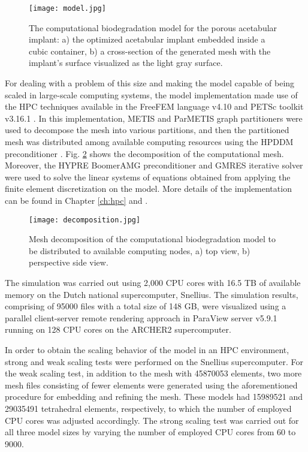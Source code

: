 \begin{figure}[h]
\centering
\medskip
\texttt{[image: model.jpg]}
\caption[Computational biodegradation model for the porous acetabular implant]{The computational biodegradation model for the porous acetabular implant: a) the optimized acetabular implant embedded inside a cubic container, b) a cross-section of the generated mesh with the implant's surface visualized as the light gray surface.} \label{fig:cup_model}
\end{figure}

For dealing with a problem of this size and making the model capable of being scaled in large-scale computing systems, the model implementation made use of the {HPC} techniques available in the FreeFEM language v4.10 and {PETSc} toolkit v3.16.1 \cite{petsc}. In this implementation, METIS and ParMETIS graph partitioners \cite{METIS1998} were used to decompose the mesh into various partitions, and then the partitioned mesh was distributed among available computing resources using the {HPDDM} preconditioner \cite{Jolivet2013}. Fig. \ref{fig:cup_decomposition} shows the decomposition of the computational mesh. Moreover, the HYPRE BoomerAMG \cite{Falgout2002} preconditioner and {GMRES} iterative solver \cite{Saad1986} were used to solve the linear systems of equations obtained from applying the finite element discretization on the model. More details of the implementation can be found in Chapter \ref{ch:hpc} and \cite{Barzegari2022}.

\begin{figure}[h]
\centering
\medskip
\texttt{[image: decomposition.jpg]}
\caption[Mesh decomposition of the acetabular implant model]{Mesh decomposition of the computational biodegradation model to be distributed to available computing nodes, a) top view, b) perspective side view. } \label{fig:cup_decomposition}
\end{figure}

The simulation was carried out using 2,000 {CPU} cores with 16.5 TB of available memory on the Dutch national supercomputer, Snellius. The simulation results, comprising of \num{95000} files with a total size of 148 GB, were visualized using a parallel client-server remote rendering approach in ParaView server v5.9.1 running on 128 {CPU} cores on the ARCHER2 supercomputer.

In order to obtain the scaling behavior of the model in an {HPC} environment, strong and weak scaling tests were performed on the Snellius supercomputer. For the weak scaling test, in addition to the mesh with \num{45870053} elements, two more mesh files consisting of fewer elements were generated using the aforementioned procedure for embedding and refining the mesh. These models had \num{15989521} and \num{29035491} tetrahedral elements, respectively, to which the number of employed {CPU} cores was adjusted accordingly. The strong scaling test was carried out for all three model sizes by varying the number of employed {CPU} cores from 60 to \num{9000}.


